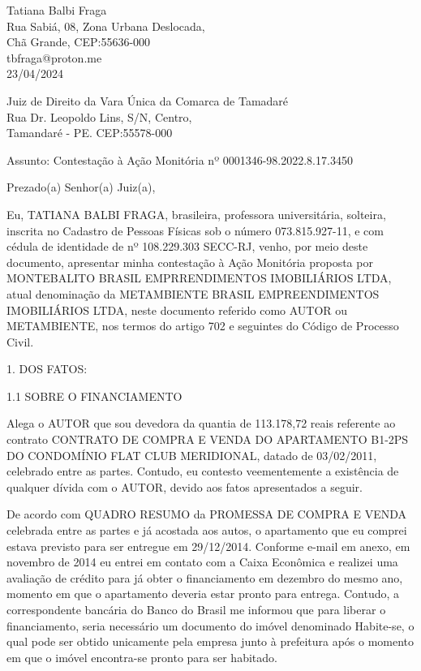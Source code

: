 \documentclass[11pt]{letter}
\begin{document}

Tatiana Balbi Fraga \\
Rua Sabiá, 08, Zona Urbana Deslocada,  \\
Chã Grande, CEP:55636-000 \\
tbfraga@proton.me \\

23/04/2024

Juiz de Direito da Vara Única da Comarca de Tamadaré \\
Rua Dr. Leopoldo Lins, S/N, Centro, \\
Tamandaré - PE. CEP:55578-000

Assunto: Contestação à Ação Monitória nº 0001346-98.2022.8.17.3450

Prezado(a) Senhor(a) Juiz(a),

Eu, TATIANA BALBI FRAGA,
brasileira, professora universitária, solteira, inscrita no Cadastro de Pessoas Físicas sob o número 073.815.927-11, e com cédula de identidade de nº 108.229.303 SECC-RJ, venho, por meio deste documento, apresentar minha contestação à Ação Monitória proposta por MONTEBALITO BRASIL EMPRRENDIMENTOS IMOBILIÁRIOS LTDA, atual
denominação da METAMBIENTE BRASIL EMPREENDIMENTOS IMOBILIÁRIOS LTDA, neste documento referido como AUTOR ou METAMBIENTE, nos termos do artigo 702 e seguintes do Código de Processo Civil.

1. DOS FATOS:

1.1 SOBRE O FINANCIAMENTO

Alega o AUTOR que sou devedora da quantia de 113.178,72 reais referente ao contrato CONTRATO DE COMPRA E VENDA DO APARTAMENTO B1-2PS DO CONDOMÍNIO FLAT CLUB MERIDIONAL, datado de 03/02/2011, celebrado entre as partes. Contudo, eu contesto veementemente a existência de qualquer dívida com o AUTOR, devido aos fatos apresentados a seguir.

De acordo com QUADRO RESUMO da PROMESSA DE COMPRA E VENDA celebrada entre as partes e já acostada aos autos, o apartamento que eu comprei estava previsto para ser entregue em 29/12/2014. Conforme e-mail em anexo, em novembro de 2014 eu entrei em contato com a Caixa Econômica e realizei uma avaliação de crédito para já obter o financiamento em dezembro do mesmo ano, momento em que o apartamento deveria estar pronto para entrega. Contudo, a correspondente bancária do Banco do Brasil me informou que para liberar o financiamento, seria necessário um documento do imóvel denominado Habite-se, o qual pode ser obtido unicamente pela empresa junto à prefeitura após o momento em que o imóvel encontra-se pronto para ser habitado.
\end{document}
